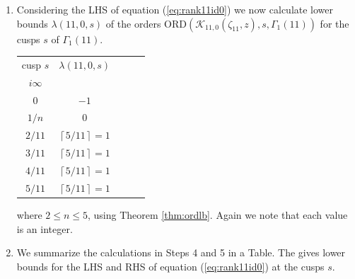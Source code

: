 \documentclass[12pt]{amsart}
\theoremstyle{definition}
\theoremstyle{remark}
\numberwithin{equation}{section}
\newcommand\CL[1]{\left\lceil#1\right\rceil}
\newcommand\ORD{\mbox{ORD}}
\newcommand\thm[1]{\ref{thm:#1}}
\newcommand\eqn[1]{(\ref{eq:#1})}
\begin{document}
\begin{enumerate}
\begin{center}
$\ORD(f,s,\Gamma_1(11))$\\
\begin{tabular}{c c c c c c c c c}\\
&&&& cusp $s$  \\
$f$ & $i\infty$ & $0$ & $1/n$ & $2/11$ & $3/11$ & $4/11$ & $5/11$  \\
$j(11,\pi_1(\overrightarrow{n_1}),z)$ &  $1$  & $-1$ & $-1$  & $2$    & $2$    &  $2$   &  $3$   \\
$j(11,\pi_2(\overrightarrow{n_1}),z)$ &  $2$  & $-1$ & $-1$  & $2$    & $3$    &  $2$   &  $1$   \\
$j(11,\pi_3(\overrightarrow{n_1}),z)$ &  $2$  & $-1$ & $-1$  & $3$    & $2$    &  $1$   &  $2$   \\
$j(11,\pi_4(\overrightarrow{n_1}),z)$ &  $2$  & $-1$ & $-1$  & $2$    & $1$    &  $3$   &  $2$   \\
$j(11,\pi_5(\overrightarrow{n_1}),z)$ &  $3$  & $-1$ & $-1$  & $1$    & $2$    &  $2$   &  $2$   
\end{tabular}
\end{center}
where $2\le n\le 5$.
\item[Step 4] Considering the LHS of equation \eqn{rank11id0}
we now calculate lower bounds $\lambda(11,0,s)$ of 
the  orders 
$\ORD\left(\mathcal{K}_{11,0}(\zeta_{11},z),s,\Gamma_1(11)\right)$ 
for the cusps $s$ of $\Gamma_1(11)$.
\begin{center}
\begin{tabular}{c c c c c}
cusp $s$ &   $\lambda(11,0,s)$\\
$i\infty$    &           \\
$0$          &   $-1$    \\
$1/n$        &   $0$     \\
$2/11$       &   $\CL{5/11}=1$  \\
$3/11$       &   $\CL{5/11}=1$  \\
$4/11$       &   $\CL{5/11}=1$  \\
$5/11$       &   $\CL{5/11}=1$  \\
\end{tabular} 
\end{center} 
where $2\le n\le 5$, using Theorem \thm{ordlb}. 
Again we note that each value is an integer.
\item[Step 5] 
We summarize the calculations in Steps 4 and 5 in a Table.
The gives lower bounds for the LHS and RHS of equation \eqn{rank11id0}
at the cusps $s$.
\begin{center}

\end{center}
\end{enumerate}
\end{document}
